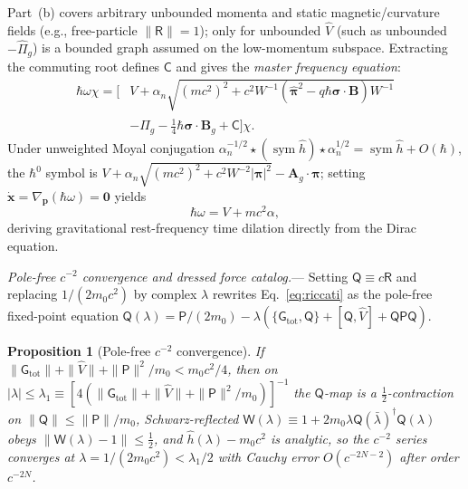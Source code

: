 \documentclass[aps,prl,reprint,superscriptaddress,nofootinbib,floatfix]{revtex4-2}
\theoremstyle{prlthm}
\newtheorem{proposition}{Proposition}
\newcommand{\prlsec}[1]{\par\smallskip\noindent\emph{#1.}---}
\begin{document}
Part~(b) covers arbitrary unbounded momenta and static magnetic/curvature fields (e.g., free-particle $\|\mathsf{R}\|=1$); only for unbounded $\hat{V}$ (such as unbounded $-\hat{\Pi}_g$) is a bounded graph assumed on the low-momentum subspace. Extracting the commuting root defines $\mathsf{C}$ and gives the \emph{master frequency equation}:
\begin{equation}
  \begin{aligned}
  \hbar\omega\chi=\Big[&V+\alpha_n\sqrt{(mc^2)^2+c^2W^{-1}(\hat{\boldsymbol{\pi}}^2-q\hbar\boldsymbol{\sigma}\cdot\mathbf{B})W^{-1}}\\
  &-\hat{\Pi}_g-\tfrac{1}{4}\hbar\boldsymbol{\sigma}\cdot\mathbf{B}_g+\mathsf{C}\Big]\chi.
  \end{aligned}
  \label{eq:master}
\end{equation}
Under unweighted Moyal conjugation $\alpha_n^{-1/2}\star(\operatorname{sym}\hat{h})\star\alpha_n^{1/2}=\operatorname{sym}\hat{h}+O(\hbar)$, the $\hbar^0$ symbol is $V+\alpha_n\sqrt{(mc^2)^2+c^2W^{-2}|\boldsymbol{\pi}|^2}-\mathbf{A}_g\cdot\boldsymbol{\pi}$; setting $\dot{\mathbf{x}}=\nabla_{\mathbf{p}}(\hbar\omega)=\mathbf{0}$ yields
\begin{equation}
  \hbar\omega=V+mc^2\alpha,
  \label{eq:static_master}
\end{equation}
deriving gravitational rest-frequency time dilation directly from the Dirac equation.

\prlsec{Pole-free $c^{-2}$ convergence and dressed force catalog}
Setting $\mathsf{Q}\equiv c\mathsf{R}$ and replacing $1/(2m_0c^2)$ by complex $\lambda$ rewrites Eq.~\eqref{eq:riccati} as the pole-free fixed-point equation $\mathsf{Q}(\lambda)=\mathsf{P}/(2m_0)-\lambda(\{\mathsf{G}_\text{tot},\mathsf{Q}\}+[\mathsf{Q},\hat{V}]+\mathsf{Q}\mathsf{P}\mathsf{Q})$.
\begin{proposition}[Pole-free $c^{-2}$ convergence]\label{prop:conv}
If $\|\mathsf{G}_{\mathrm{tot}}\|+\|\hat{V}\|+\|\mathsf{P}\|^2/m_0<m_0c^2/4$, then on $|\lambda|\le\lambda_1\equiv[4(\|\mathsf{G}_{\mathrm{tot}}\|+\|\hat{V}\|+\|\mathsf{P}\|^2/m_0)]^{-1}$ the $\mathsf{Q}$-map is a $\tfrac{1}{2}$-contraction on $\|\mathsf{Q}\|\le\|\mathsf{P}\|/m_0$, Schwarz-reflected $\mathsf{W}(\lambda)\equiv 1+2m_0\lambda\mathsf{Q}(\bar{\lambda})^\dagger\mathsf{Q}(\lambda)$ obeys $\|\mathsf{W}(\lambda)-1\|\le\tfrac{1}{2}$, and $\hat{h}(\lambda)-m_0c^2$ is analytic, so the $c^{-2}$ series converges at $\lambda=1/(2m_0c^2)<\lambda_1/2$ with Cauchy error $O(c^{-2N-2})$ after order $c^{-2N}$.
\end{proposition}
\end{document}
